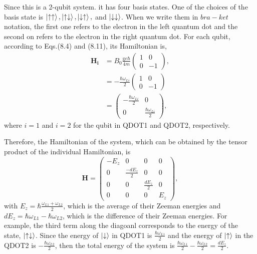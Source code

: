 \documentclass{article}
\begin{document}
Since this is a 2-qubit system. it has four basis states. One of the choices of the basis state
is $\ket{\uparrow\uparrow},\ket{\uparrow\downarrow},\ket{\downarrow\uparrow},$ and $\ket{\downarrow\downarrow}$.
When we write them in $bra-ket$ notation, the first one refers to the electron in the left quantum
dot and the second on refers to the electron in the right quantum dot. For each qubit, according to Eqs.(8.4) and (8.11),
its Hamiltonian is,
\begin{align*}\label{eq 12.11}
  \boldsymbol{H_i}&=B_0\frac{\text{g}e\hbar}{4m}\begin{pmatrix}
    1& 0\\ 0& -1
  \end{pmatrix},\\
  &=-\frac{\hbar\omega_{Li}}{2}\begin{pmatrix}
    1&0\\0&-1
  \end{pmatrix}\\
  &= \begin{pmatrix}
    -\frac{\hbar\omega_{Li}}{2}&0\\0&\frac{\hbar\omega_{Li}}{2}
  \end{pmatrix},\tag{12.11}
\end{align*}
where $i=1$ and $i=2$ for the qubit in QDOT1 and QDOT2, respectively.

Therefore, the Hamiltonian of the system, which can be obtained by the tensor product
of the individual Hamiltonian, is
\begin{equation}\label{eq 12.12}
  \boldsymbol{H}=\begin{pmatrix}
    -E_z&0&0&0\\0&\frac{-dE_z}{2}&0&0\\0&0&\frac{dE_z}{2}&0\\0&0&0&E_z
  \end{pmatrix},\tag{12.12}
\end{equation}
with $E_z=\hbar\frac{\omega_{L1}+\omega_{L2}}{2}$, which is the average of their Zeeman energies and
$dE_z=\hbar\omega_{L1}-\hbar\omega_{L2}$, which is the difference of their Zeeman energies. For example, 
the third term along the diagoanl corresponds to the energy of the state, $\ket{\uparrow\downarrow}$. Since
the energy of $\ket{\downarrow}$ in QDOT1 is $\frac{\hbar\omega_{L1}}{2}$ and the energy of $\ket{\uparrow}$
in the QDOT2 is $-\frac{\hbar\omega_{L2}}{2}$, then the total energy of the system is $\frac{\hbar\omega_{L1}}{2}-\frac{\hbar\omega_{L2}}{2}=\frac{dE_z}{2}$.
\end{document}
